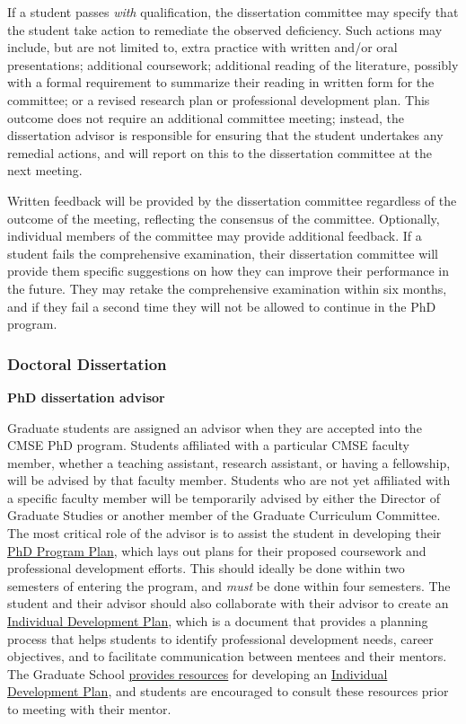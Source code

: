 If a student passes \textit{with} qualification, the dissertation committee
may specify that the student take action to remediate the observed
deficiency.  Such actions may include, but are not limited to, extra
practice with written and/or oral presentations; additional
coursework; additional reading of the literature, possibly with a
formal requirement to summarize their reading in written form for the
committee; or a revised research plan or professional development
plan.  This outcome does not require an additional committee meeting;
instead, the dissertation advisor is responsible for ensuring that the
student undertakes any remedial actions, and will report on this to
the dissertation committee at the next meeting.

Written feedback will be provided by the dissertation committee
regardless of the outcome of the meeting, reflecting the consensus of
the committee.  Optionally, individual members of the committee may
provide additional feedback.
If a student fails the comprehensive examination, their dissertation
committee will provide them specific suggestions on
how they can improve their performance in the future.  They may retake
the comprehensive examination within six months, and if they fail a
second time they will not be allowed to continue in the PhD program.


\vspace{3mm}
\subsubsection{Doctoral Dissertation}
\label{sec:phd_dissertation}

\vspace{3mm}
\noindent
\textbf{PhD dissertation advisor}

Graduate students are assigned an advisor when they are accepted into
the CMSE PhD program.  Students affiliated with a particular CMSE
faculty member, whether a teaching assistant, research assistant, or
having a fellowship, will be advised by that faculty member.  Students
who are not yet affiliated with a specific faculty member will be
temporarily advised by either the Director of Graduate Studies or
another member of the Graduate Curriculum Committee.  The most
critical role of the advisor is to assist the student in developing
their \href{https://login.msu.edu/?App=J3205}{PhD Program Plan}, which
lays out plans for their proposed coursework and professional
development efforts.  This should ideally be done within two semesters
of entering the program, and \textit{must} be done within four
semesters.  The student and their advisor should also collaborate with
their advisor to create an
\href{http://caffe.grd.msu.edu/IDP}{Individual Development Plan},
which is a document that provides a planning process that helps
students to identify professional development needs, career
objectives, and to facilitate communication between mentees and their
mentors.  The Graduate School
\href{https://grad.msu.edu/prep}{provides resources} for developing an
\href{http://caffe.grd.msu.edu/IDP}{Individual Development Plan}, and
students are encouraged to consult these resources prior to meeting
with their mentor.

